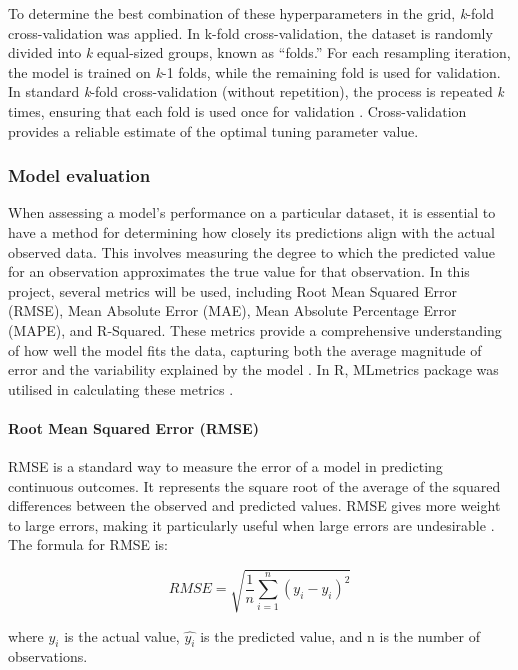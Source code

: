 \documentclass[11pt,a4paper,]{article}
\begin{document}
To determine the best combination of these hyperparameters in the grid, \emph{k}-fold cross-validation was applied. In k-fold cross-validation, the dataset is randomly divided into \emph{k} equal-sized groups, known as ``folds.'' For each resampling iteration, the model is trained on \emph{k}-1 folds, while the remaining fold is used for validation. In standard \emph{k}-fold cross-validation (without repetition), the process is repeated \emph{k} times, ensuring that each fold is used once for validation \autocite{tidymodels}. Cross-validation provides a reliable estimate of the optimal tuning parameter value.

\subsubsection{Model evaluation}\label{model-evaluation}

When assessing a model's performance on a particular dataset, it is essential to have a method for determining how closely its predictions align with the actual observed data. This involves measuring the degree to which the predicted value for an observation approximates the true value for that observation. In this project, several metrics will be used, including Root Mean Squared Error (RMSE), Mean Absolute Error (MAE), Mean Absolute Percentage Error (MAPE), and R-Squared. These metrics provide a comprehensive understanding of how well the model fits the data, capturing both the average magnitude of error and the variability explained by the model \autocite{ISLR,Hastie09}. In R, MLmetrics package was utilised in calculating these metrics \autocite{MLmetrics}.

\paragraph{Root Mean Squared Error (RMSE)}\label{root-mean-squared-error-rmse}

RMSE is a standard way to measure the error of a model in predicting continuous outcomes. It represents the square root of the average of the squared differences between the observed and predicted values. RMSE gives more weight to large errors, making it particularly useful when large errors are undesirable \autocite{ISLR,Hastie09}. The formula for RMSE is:

\[RMSE = \sqrt{\frac{1}{n} {\sum^n_{i=1}(y_i-\hat{y_i})^2}}\]

where \(y_i\) is the actual value, \(\hat{y_i}\) is the predicted value, and n is the number of observations.
\end{document}
